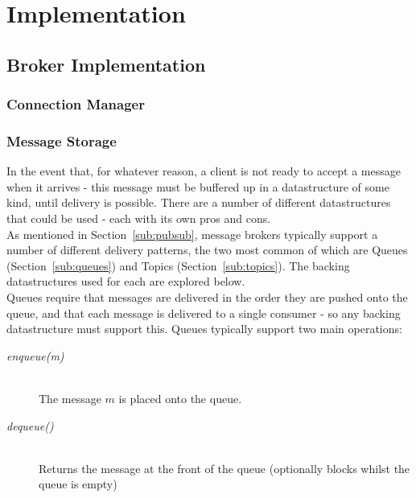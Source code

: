 \chapter{Implementation}
\label{chap:Implementation}

\section{Broker Implementation}
\label{sec:Broker Implementation}


\subsection{Connection Manager}
\label{sub:Connection Manager}


\subsection{Message Storage}
\label{sub:Message Handlers}

In the event that, for whatever reason, a client is not ready to accept a
message when it arrives - this message must be buffered up in a datastructure of
some kind, until delivery is possible. There are a number of different
datastructures that could be used - each with its own pros and cons. \\

As mentioned in Section~\ref{sub:pubsub}, message brokers typically support a
number of different delivery patterns, the two most common of which are Queues
(Section~\ref{sub:queues}) and Topics (Section~\ref{sub:topics}). The backing
datastructures used for each are explored below. \\

Queues require that messages are delivered in the order they are pushed onto the
queue, and that each message is delivered to a single consumer - so any backing
datastructure must support this. Queues typically support two main operations:

\begin{description}
  \item[\textit{enqueue(m)}] \hfill \\
    The message $m$ is placed onto the queue.
  \item[\textit{dequeue()}] \hfill \\
    Returns the message at the front of the queue (optionally blocks whilst the queue is empty)
\end{description}

